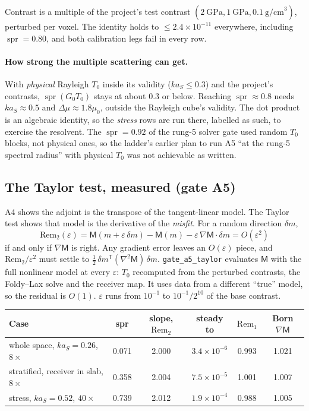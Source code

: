 \documentclass[11pt,a4paper]{article}
\newcommand{\Tz}{T_0}
\newcommand{\Gz}{G_0}
\newcommand{\T}{\mathsf{T}}
\begin{document}
\noindent Contrast is a multiple of the project's test contrast $(2\ \text{GPa},1\ \text{GPa},
0.1\ \text{g/cm}^3)$, perturbed per voxel. The identity holds to $\le2.4\times10^{-11}$ everywhere,
including $\operatorname{spr}=0.80$, and both calibration legs fail in every row.

\paragraph{How strong the multiple scattering can get.} With \emph{physical} Rayleigh $\Tz$
inside its validity ($ka_S\le0.3$) and the project's contrasts, $\operatorname{spr}(\Gz\Tz)$ stays at about $0.3$ or
below. Reaching $\operatorname{spr}\approx0.8$ needs $ka_S\approx0.5$ and $\Delta\mu\approx1.8\mu_0$, outside the
Rayleigh cube's validity. The dot product is an algebraic identity, so the \emph{stress} rows are
run there, labelled as such, to exercise the resolvent. The $\operatorname{spr}=0.92$ of the rung-5 solver gate
used random $\Tz$ blocks, not physical ones, so the ladder's earlier plan to run A5 ``at the rung-5
spectral radius'' with physical $\Tz$ was not achievable as written.

\subsection{The Taylor test, measured (gate A5)}\label{sec:a5}

A4 shows the adjoint is the transpose of the tangent-linear model. The Taylor test shows that
model is the derivative of the \emph{misfit}. For a random direction $\delta m$,
\begin{equation}\label{eq:taylor}
  \mathrm{Rem}_2(\varepsilon) = \mathsf{M}(m+\varepsilon\,\delta m) - \mathsf{M}(m) - \varepsilon\,\nabla\mathsf{M}\cdot\delta m
  = O(\varepsilon^2)
\end{equation}
if and only if $\nabla\mathsf{M}$ is right. Any gradient error leaves an $O(\varepsilon)$ piece, and
$\mathrm{Rem}_2/\varepsilon^2$ must settle to $\tfrac12\,\delta m^{\T}(\nabla^2\mathsf{M})\,\delta m$.
\nolinkurl{gate_a5_taylor} evaluates $\mathsf{M}$ with the full nonlinear model at every $\varepsilon$:
$\Tz$ recomputed from the perturbed contrasts, the Foldy--Lax solve and the receiver map. It uses
data from a different ``true'' model, so the residual is $O(1)$. $\varepsilon$ runs from $10^{-1}$
to $10^{-1}/2^{10}$ of the base contrast.

\begin{center}
\small
\setlength{\tabcolsep}{4pt}\begin{tabular}{@{}lccccc@{}}
\toprule
Case & spr & slope, $\mathrm{Rem}_2$ & steady to & $\mathrm{Rem}_1$ & Born $\nabla\mathsf{M}$ \\
\midrule
whole space, $ka_S=0.26$, $8\times$ & 0.071 & 2.000 & $3.4\times10^{-6}$ & 0.993 & 1.021 \\
stratified, receiver in slab, $8\times$ & 0.358 & 2.004 & $7.5\times10^{-5}$ & 1.001 & 1.007 \\
stress, $ka_S=0.52$, $40\times$ & 0.739 & 2.012 & $1.9\times10^{-4}$ & 0.988 & 1.005 \\
\bottomrule
\end{tabular}
\end{center}
\end{document}
